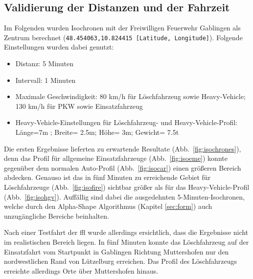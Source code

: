 \newpage
\subsection{Validierung der Distanzen und der Fahrzeit}

Im Folgenden wurden Isochronen mit der Freiwilligen Feuerwehr Gablingen als Zentrum berechnet (\texttt{48.454063,10.824415 [Latitude, Longitude]}).
Folgende Einstellungen wurden dabei genutzt:
\sloppy
\begin{itemize}
\item Distanz: 5 Minuten
\item Intervall: 1 Minuten
\item Maximale Geschwindigkeit: 80 km/h für Löschfahrzeug sowie Heavy-Vehicle; 130 km/h für PKW sowie Einsatzfahrzeug
\item Heavy-Vehicle-Einstellungen für Löschfahrzeug- und Heavy-Vehicle-Profil: Länge=7m ; Breite= 2.5m; Höhe= 3m; Gewicht= 7.5t
\end{itemize}
\fussy

Die ersten Ergebnisse lieferten zu erwartende Resultate (Abb.~\ref{fig:isochrones}), denn das Profil für allgemeine Einsatzfahrzeuge (Abb.~\ref{fig:isoeme}) konnte gegenüber dem normalen Auto-Profil (Abb.~\ref{fig:isocar}) einen größeren Bereich abdecken.
Genauso ist das in fünf Minuten zu erreichende Gebiet für Löschfahrzeuge (Abb.~\ref{fig:isofire}) sichtbar größer als für das Heavy-Vehicle-Profil (Abb.~\ref{fig:isohgv}).
Auffällig sind dabei die ausgedehnten 5-Minuten-Isochronen, welche durch den Alpha-Shape Algorithmus (Kapitel \ref{sec:form}) auch unzugängliche Bereiche beinhalten.

Nach einer Testfahrt der \gls{ffl} wurde allerdings ersichtlich, dass die Ergebnisse nicht im realistischen Bereich liegen.
In fünf Minuten konnte das Löschfahrzeug auf der Einsatzfahrt vom Startpunkt in Gablingen Richtung Muttershofen nur den nordwestlichen Rand von Lützelburg erreichen.
Das Profil des Löschfahrzeugs erreichte allerdings Orte über Muttershofen hinaus.

